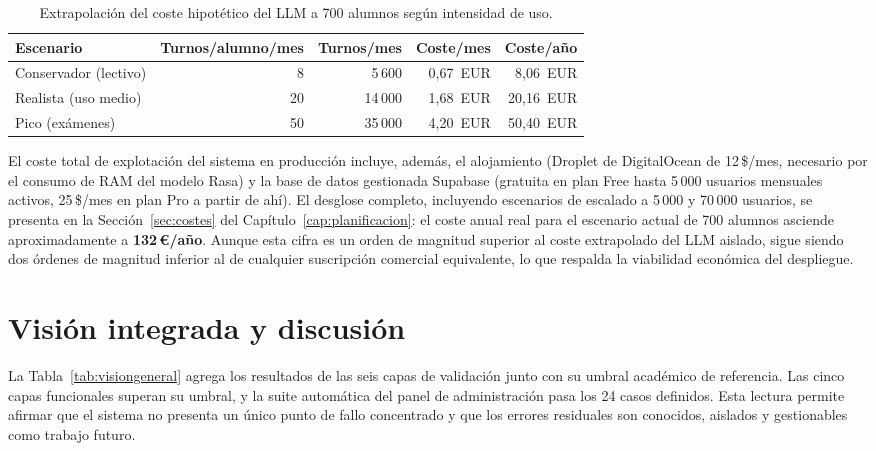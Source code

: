 \begin{table}[hbtp]
\centering
\caption{Extrapolación del coste hipotético del LLM a 700 alumnos según intensidad de uso.}\label{tab:coste-extrapolado}
\begin{tabular}{lrrrr}
\hline
\textbf{Escenario} & \textbf{Turnos/alumno/mes} & \textbf{Turnos/mes} & \textbf{Coste/mes} & \textbf{Coste/año} \\
\hline
Conservador (lectivo) & 8 & 5\,600 & 0,67~EUR & 8,06~EUR \\
Realista (uso medio) & 20 & 14\,000 & 1,68~EUR & 20,16~EUR \\
Pico (exámenes) & 50 & 35\,000 & 4,20~EUR & 50,40~EUR \\
\hline
\end{tabular}
\end{table}

El coste total de explotación del sistema en producción incluye, además, el alojamiento (Droplet de DigitalOcean de 12\,\$/mes, necesario por el consumo de RAM del modelo Rasa) y la base de datos gestionada Supabase (gratuita en plan Free hasta 5\,000 usuarios mensuales activos, 25\,\$/mes en plan Pro a partir de ahí). El desglose completo, incluyendo escenarios de escalado a 5\,000 y 70\,000 usuarios, se presenta en la Sección~\ref{sec:costes} del Capítulo~\ref{cap:planificacion}: el coste anual real para el escenario actual de 700 alumnos asciende aproximadamente a \textbf{132\,€/año}. Aunque esta cifra es un orden de magnitud superior al coste extrapolado del LLM aislado, sigue siendo dos órdenes de magnitud inferior al de cualquier suscripción comercial equivalente, lo que respalda la viabilidad económica del despliegue.

\section{Visión integrada y discusión}\label{sec:pruebas-discusion}

La Tabla~\ref{tab:visiongeneral} agrega los resultados de las seis capas de validación junto con su umbral académico de referencia. Las cinco capas funcionales superan su umbral, y la suite automática del panel de administración pasa los 24 casos definidos. Esta lectura permite afirmar que el sistema no presenta un único punto de fallo concentrado y que los errores residuales son conocidos, aislados y gestionables como trabajo futuro.

